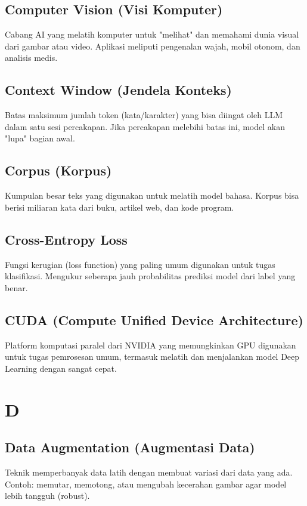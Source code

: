 \subsection*{Computer Vision (Visi Komputer)}
Cabang AI yang melatih komputer untuk "melihat" dan memahami dunia visual dari gambar atau video. Aplikasi meliputi pengenalan wajah, mobil otonom, dan analisis medis.

\subsection*{Context Window (Jendela Konteks)}
Batas maksimum jumlah token (kata/karakter) yang bisa diingat oleh LLM dalam satu sesi percakapan. Jika percakapan melebihi batas ini, model akan "lupa" bagian awal.

\subsection*{Corpus (Korpus)}
Kumpulan besar teks yang digunakan untuk melatih model bahasa. Korpus bisa berisi miliaran kata dari buku, artikel web, dan kode program.

\subsection*{Cross-Entropy Loss}
Fungsi kerugian (loss function) yang paling umum digunakan untuk tugas klasifikasi. Mengukur seberapa jauh probabilitas prediksi model dari label yang benar.

\subsection*{CUDA (Compute Unified Device Architecture)}
Platform komputasi paralel dari NVIDIA yang memungkinkan GPU digunakan untuk tugas pemrosesan umum, termasuk melatih dan menjalankan model Deep Learning dengan sangat cepat.

\section*{D}

\subsection*{Data Augmentation (Augmentasi Data)}
Teknik memperbanyak data latih dengan membuat variasi dari data yang ada. Contoh: memutar, memotong, atau mengubah kecerahan gambar agar model lebih tangguh (robust).

